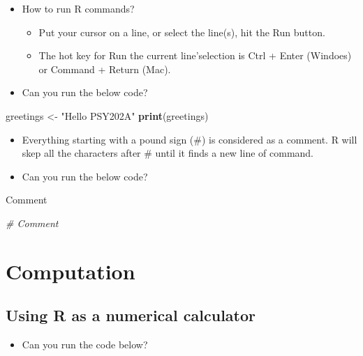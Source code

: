 \documentclass[
]{book}
\newenvironment{Shaded}{\begin{snugshade}}{\end{snugshade}}
\newcommand{\CommentTok}[1]{\textcolor[rgb]{0.56,0.35,0.01}{\textit{#1}}}
\newcommand{\FunctionTok}[1]{\textcolor[rgb]{0.13,0.29,0.53}{\textbf{#1}}}
\newcommand{\NormalTok}[1]{#1}
\newcommand{\OtherTok}[1]{\textcolor[rgb]{0.56,0.35,0.01}{#1}}
\newcommand{\StringTok}[1]{\textcolor[rgb]{0.31,0.60,0.02}{#1}}
\providecommand{\tightlist}{%
  \setlength{\itemsep}{0pt}\setlength{\parskip}{0pt}}
\begin{document}
\begin{itemize}
\tightlist
\item
  How to run R commands?

  \begin{itemize}
  \tightlist
  \item
    Put your cursor on a line, or select the line(s), hit the Run button.
  \item
    The hot key for Run the current line'selection is Ctrl + Enter (Windoes) or Command + Return (Mac).
  \end{itemize}
\item
  Can you run the below code?
\end{itemize}

\begin{Shaded}
\begin{Highlighting}[]
\NormalTok{greetings }\OtherTok{\textless{}{-}} \StringTok{"Hello PSY202A"}
\FunctionTok{print}\NormalTok{(greetings)}
\end{Highlighting}
\end{Shaded}

\begin{itemize}
\item
  Everything starting with a pound sign (\#) is considered as a comment. R will skep all the characters after \# until it finds a new line of command.
\item
  Can you run the below code?
\end{itemize}

\begin{Shaded}
\begin{Highlighting}[]
\NormalTok{Comment}

\CommentTok{\# Comment}
\end{Highlighting}
\end{Shaded}

\section{Computation}\label{computation}

\subsection{Using R as a numerical calculator}\label{using-r-as-a-numerical-calculator}

\begin{itemize}
\tightlist
\item
  Can you run the code below?
\end{itemize}
\end{document}
